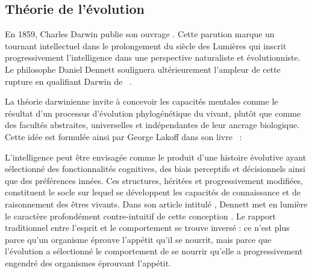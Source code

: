 \subsection{Théorie de l'évolution}


\noindent
En 1859, Charles Darwin publie son ouvrage   \cite{darwin_origin_1859}.
Cette parution marque un tournant intellectuel dans le prolongement du siècle des Lumières qui inscrit progressivement l’intelligence dans une perspective naturaliste et évolutionniste.
Le philosophe Daniel Dennett soulignera ultérieurement l'ampleur de cette rupture en qualifiant Darwin de \og {} \fg\   \cite[p.~10061]{dennett_darwins_2009}.

La théorie darwinienne invite à concevoir les capacités mentales comme le résultat d’un processus d’évolution phylogénétique du vivant, plutôt que comme des facultés abstraites, universelles et indépendantes de leur ancrage biologique.
Cette idée est formulée ainsi par George Lakoff dans son livre \og {} \fg\ :

\begin{quote}
\cite[p.~4]{lakoff_philosophy_1999}
\end{quote}

L'intelligence peut être envisagée comme le produit d'une histoire évolutive ayant sélectionné des fonctionnalités cognitives, des biais perceptifs et décisionnels ainsi que des préférences innées.  
Ces structures, héritées et progressivement modifiées, constituent le socle sur lequel se développent les capacités de connaissance et de raisonnement des êtres vivants.
Dans son article intitulé \og {} \fg, Dennett met en lumière le caractère profondément contre-intuitif de cette conception
\cite{dennett_darwins_2009}. 
Le rapport traditionnel entre l'esprit et le comportement se trouve inversé : ce n'est plus parce qu'un organisme éprouve l'appétit qu'il se nourrit, mais parce que l'évolution a sélectionné le comportement de se nourrir qu'elle a progressivement engendré des organismes éprouvant l'appétit. 

